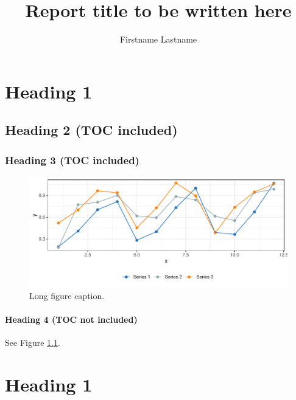 \documentclass[11pt]{lukereport}
\title{Report title to be written here}
\author{Firstname Lastname}
\begin{document}
\maketitle

\begin{abstract}
\lipsum[2-3]
\end{abstract}

\setcounter{page}{5}

\setcounter{tocdepth}{0}



\tableofcontents



\chapter{Heading 1}

\lipsum[1]

\section{Heading 2 (TOC included)}

\lipsum[2]

\subsection{Heading 3 (TOC included)}
\begin{figure}[!hb]
	\centering
	\includegraphics[width=.8\linewidth]{fig_ex1}
	\caption[short figure caption]{Long figure caption.}
	\label{fig:figex1}
\end{figure}

\lipsum[4]

\subsubsection{Heading 4 (TOC not included)}


\lipsum[6] See Figure \ref{fig:figex1}.


\chapter{Heading 1}
\end{document}
